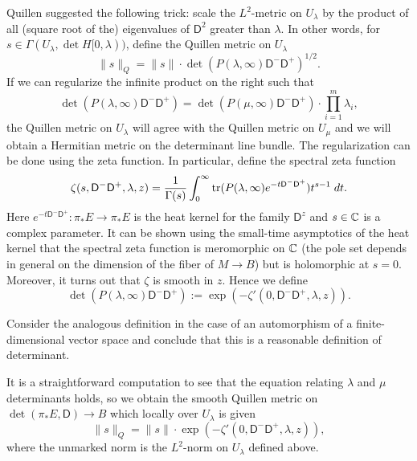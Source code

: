 \documentclass{amsart}
\renewcommand\d{\mathsf{D}}
\begin{document}
Quillen suggested the following trick: scale the $L^2$-metric on $U_\lambda$ by the product
of all (square root of the) eigenvalues of $\d^2$ greater than $\lambda$. In other words,
for $s\in\Gamma(U_\lambda,\det H[0,\lambda))$, define the Quillen metric on $U_\lambda$
\begin{equation*}
    \lVert s\rVert_Q = \lVert s\rVert \cdot \det(P(\lambda,\infty)\d^-\d^+)^{1/2}.
\end{equation*}
If we can regularize the infinite product on the right such that
\begin{equation*}
    \det(P(\lambda,\infty)\d^-\d^+) = \det(P(\mu,\infty)\d^-\d^+) \cdot \prod_{i=1}^m\lambda_i,
\end{equation*}
the Quillen metric on $U_\lambda$ will agree
with the Quillen metric on $U_\mu$ and we will obtain a Hermitian metric on the determinant
line bundle. The regularization can be done using the zeta function. In particular, define
the spectral zeta function
\begin{equation*}
    \zeta(s, \d^-\d^+, \lambda, z) = \frac{1}{\Gamma(s)}\int_0^\infty \tr(P(\lambda,\infty)e^{-t\d^-\d^+})t^{s-1}\;dt.
\end{equation*}
Here $e^{-t\d^-\d^+}:\pi_*E\to\pi_*E$ is the heat kernel for the family $\d^z$ and $s\in\mathbb{C}$
is a complex parameter. It can be shown using the small-time asymptotics of the heat kernel
that the spectral zeta function is meromorphic on $\mathbb{C}$ (the pole set depends in general on
the dimension of the fiber of $M\to B$) but is holomorphic at $s=0$. Moreover, it turns
out that $\zeta$ is smooth in $z$. Hence we define
\begin{equation*}
    \det(P(\lambda,\infty)\d^-\d^+) := \exp(-\zeta'(0,\d^-\d^+,\lambda,z)).
\end{equation*}
\begin{exercise}
    Consider the analogous definition in the case of an automorphism of a finite-dimensional
    vector space and conclude that this is a reasonable definition of determinant.
\end{exercise}
It is a straightforward computation to see that the equation relating $\lambda$ and $\mu$
determinants holds, so we obtain the smooth Quillen metric on $\det(\pi_*E,\d)\to B$ which
locally over $U_\lambda$ is given
\begin{equation*}
    \lVert s\rVert_Q = \lVert s\rVert \cdot \exp(-\zeta'(0,\d^-\d^+,\lambda,z)),
\end{equation*}
where the unmarked norm is the $L^2$-norm on $U_\lambda$ defined above.
\end{document}
